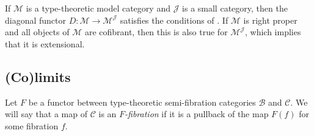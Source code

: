 \documentclass[reqno]{amsart}
\theoremstyle{definition}
\theoremstyle{remark}
\newcommand{\fs}[1]{\mathrm{#1}}
\newcommand{\cat}[1]{\mathbf{#1}}
\newcommand{\scat}[1]{\mathcal{#1}}
\newcommand{\sSet}{\cat{sSet}}
\numberwithin{figure}{section}
\begin{document}
\begin{example}
If $\scat{M}$ is a type-theoretic model category and $\scat{J}$ is a small category, then the diagonal functor $D: \scat{M} \to \scat{M}^\scat{J}$ satisfies the conditions of .
If $\scat{M}$ is right proper and all objects of $\scat{M}$ are cofibrant, then this is also true for $\scat{M}^\scat{J}$, which implies that it is extensional.
\end{example}

\subsection{(Co)limits}

Let $F$ be a functor between type-theoretic semi-fibration categories $\scat{B}$ and $\scat{C}$.
We will say that a map of $\scat{C}$ is an \emph{$F$-fibration} if it is a pullback of the map $F(f)$ for some fibration $f$.
\end{document}
